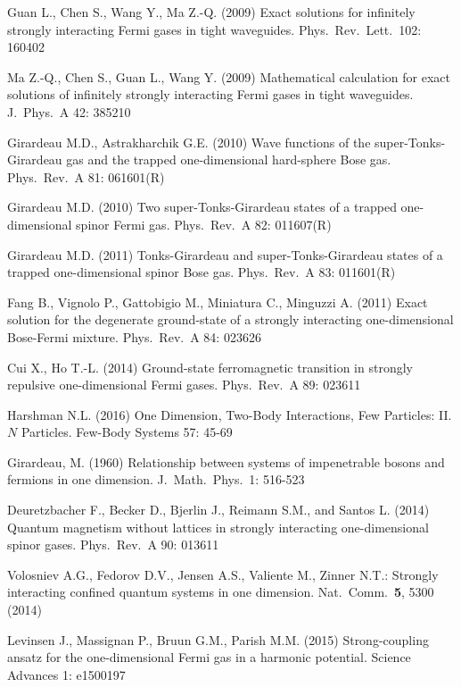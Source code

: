 \begin{thebibliography}{3}
 Guan L., Chen S., Wang Y., Ma Z.-Q. (2009) Exact solutions for infinitely strongly interacting Fermi gases in tight waveguides. Phys.\ Rev.\ Lett.\ 102: 160402

  Ma Z.-Q., Chen S., Guan L., Wang Y. (2009) Mathematical calculation for exact solutions of infinitely strongly interacting Fermi gases in tight waveguides. J.\ Phys.\ A 42: 385210


 Girardeau M.D., Astrakharchik G.E. (2010) Wave functions of the super-Tonks-Girardeau gas and the trapped one-dimensional hard-sphere Bose gas. Phys.\ Rev.\ A  81: 061601(R)

 Girardeau M.D. (2010) Two super-Tonks-Girardeau states of a trapped one-dimensional spinor Fermi gas. Phys.\ Rev.\ A 82: 011607(R)

 Girardeau M.D. (2011) Tonks-Girardeau and super-Tonks-Girardeau states of a trapped one-dimensional spinor Bose gas. Phys.\ Rev.\ A  83: 011601(R)

 Fang B., Vignolo P., Gattobigio M., Miniatura C., Minguzzi A. (2011) Exact solution for the degenerate ground-state of a strongly interacting one-dimensional Bose-Fermi mixture. Phys.\ Rev.\ A 84: 023626

 Cui X., Ho T.-L. (2014) Ground-state ferromagnetic transition in strongly repulsive one-dimensional Fermi gases. Phys.\ Rev.\ A 89: 023611

 Harshman N.L. (2016) One Dimension, Two-Body Interactions, Few Particles: II. $N$ Particles. Few-Body Systems 57: 45-69

 Girardeau, M. (1960) Relationship between systems of impenetrable bosons and fermions in one dimension. J.\ Math.\ Phys.\ 1: 516-523 
	
 Deuretzbacher F., Becker D., Bjerlin J., Reimann S.M., and Santos L. (2014) Quantum magnetism without lattices in strongly interacting one-dimensional spinor gases. Phys.\ Rev.\ A 90: 013611 

 Volosniev A.G., Fedorov D.V., Jensen A.S., Valiente M., Zinner N.T.: Strongly interacting confined quantum systems in one dimension.  Nat.\ Comm.\ {\bf 5}, 5300 (2014)

 Levinsen J., Massignan P., Bruun G.M., Parish M.M. (2015) Strong-coupling ansatz for the one-dimensional Fermi gas in a harmonic potential. Science Advances 1: e1500197 


\end{thebibliography}

